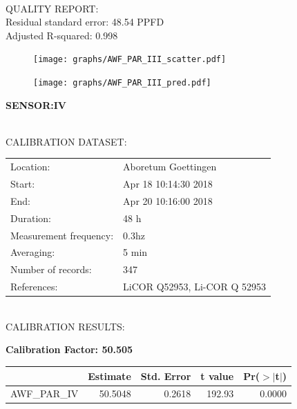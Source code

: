 \documentclass[oneside]{report}
\begin{document}
\hrulefill\\
QUALITY REPORT:\\
Residual standard error: 48.54 PPFD\\
Adjusted R-squared: 0.998



\begin{figure}[H]
  \centering
  \texttt{[image: graphs/AWF\_PAR\_III\_scatter.pdf]}
\end{figure}




\begin{figure}[H]
  \centering
  \texttt{[image: graphs/AWF\_PAR\_III\_pred.pdf]}
\end{figure}

\pagebreak


\begin{center}
\large{\textbf{SENSOR:IV}}\\
\end{center}

\hrulefill\\
CALIBRATION DATASET:\\
\begin{table}[h!]
  \centering
  \label{tab:table1}
  \begin{tabular}{ll}
    Location: & Aboretum Goettingen\\ 
    
    
    Start:  & Apr 18 10:14:30 2018 \\
    End:   & Apr 20 10:16:00 2018\\ 
    Duration: & 48 h\\
    Measurement frequency: & 0.3hz\\
    Averaging:  &5 min\\
    Number of records: & 347 \\
    References: & LiCOR Q52953, Li-COR Q 52953 \\
  \end{tabular}
\end{table}

\hrulefill\\
CALIBRATION RESULTS:\\


\begin{center}
\textbf{\large{Calibration Factor: 50.505}}\\
\end{center}
\begin{table}[ht]
\centering
\begin{tabular}{rrrrr}
  \hline
 & Estimate & Std. Error & t value & Pr($>$$|$t$|$) \\ 
  \hline
AWF\_PAR\_IV & 50.5048 & 0.2618 & 192.93 & 0.0000 \\ 
   \hline
\end{tabular}
\end{table}
\end{document}
